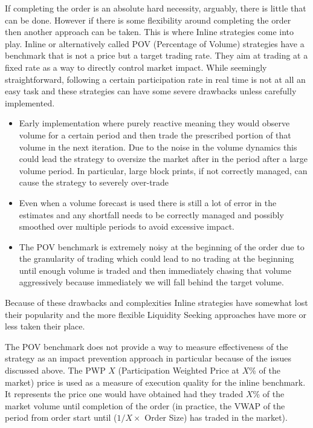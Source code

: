 If completing the order is an absolute hard necessity, arguably, there is little that can be done. However if there is some flexibility around completing the order then another approach can be taken. This is where Inline strategies come into play. Inline or alternatively called POV (Percentage of Volume) strategies have a benchmark that is not a price but a target trading rate. They aim at trading at a fixed rate as a way to directly control market impact. While seemingly straightforward, following a certain participation rate in real time is not at all an easy task and these strategies can have some severe drawbacks unless carefully implemented.


\begin{itemize}
\item Early implementation where purely reactive meaning they would observe volume for a certain period and then trade the prescribed portion of that volume in the next iteration. Due to the noise in the volume dynamics this could lead the strategy to oversize the market after in the period after a large volume period. In particular, large block prints, if not correctly managed, can cause the strategy to severely over-trade

\item Even when a volume forecast is used there is still a lot of error in the estimates and any shortfall needs to be correctly managed and possibly smoothed over multiple periods to avoid excessive impact.

\item The POV benchmark is extremely noisy at the beginning of the order due to the granularity of trading which could lead to no trading at the beginning until enough volume is traded and then immediately chasing that volume aggressively because immediately we will fall behind the target volume.
\end{itemize}


Because of these drawbacks and complexities Inline strategies have somewhat lost their popularity and the more flexible Liquidity Seeking approaches  have more or less taken their place.


The POV benchmark does not provide a way to measure effectiveness of the strategy as an impact prevention approach in particular because of the issues discussed above. The PWP $X$ (Participation Weighted Price at $X$\% of the market) price is used as a measure of execution quality for the inline benchmark. It represents the price one would have obtained had they traded $X$\% of the market volume until completion of the order (in practice, the VWAP of the period from order start until ($1/X \times$ Order Size) has traded in the market). \\

